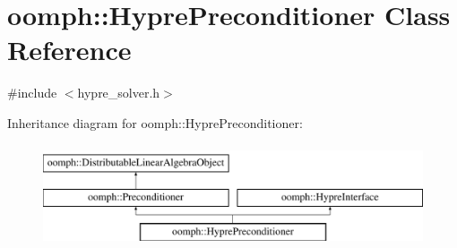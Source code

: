 \hypertarget{classoomph_1_1HyprePreconditioner}{}\section{oomph\+:\+:Hypre\+Preconditioner Class Reference}
\label{classoomph_1_1HyprePreconditioner}


{\ttfamily \#include $<$hypre\+\_\+solver.\+h$>$}

Inheritance diagram for oomph\+:\+:Hypre\+Preconditioner\+:\begin{figure}[H]
\begin{center}
\leavevmode
\includegraphics[height=3.000000cm]{classoomph_1_1HyprePreconditioner}
\end{center}
\end{figure}
